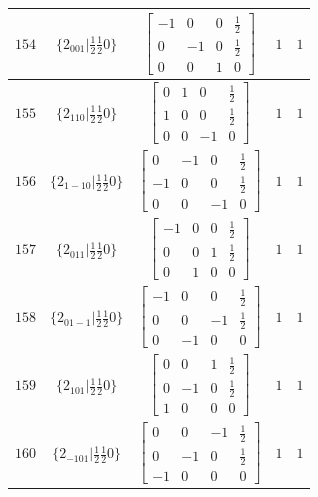 \documentclass[fleqn,8pt]{jsarticle}
\begin{document}
\begin{longtable}{ccccc}
$ 154 $ & $ \{2{}_{001}|\frac{1}{2} \frac{1}{2} 0\} $ & $ \begin{bmatrix} -1 & 0 & 0 & \frac{1}{2} \\ 0 & -1 & 0 & \frac{1}{2} \\ 0 & 0 & 1 & 0 \end{bmatrix} $ & $ 1 $ & $ 1 $ \\ \hline
$ 155 $ & $ \{2{}_{110}|\frac{1}{2} \frac{1}{2} 0\} $ & $ \begin{bmatrix} 0 & 1 & 0 & \frac{1}{2} \\ 1 & 0 & 0 & \frac{1}{2} \\ 0 & 0 & -1 & 0 \end{bmatrix} $ & $ 1 $ & $ 1 $ \\ \hline
$ 156 $ & $ \{2{}_{1-10}|\frac{1}{2} \frac{1}{2} 0\} $ & $ \begin{bmatrix} 0 & -1 & 0 & \frac{1}{2} \\ -1 & 0 & 0 & \frac{1}{2} \\ 0 & 0 & -1 & 0 \end{bmatrix} $ & $ 1 $ & $ 1 $ \\ \hline
$ 157 $ & $ \{2{}_{011}|\frac{1}{2} \frac{1}{2} 0\} $ & $ \begin{bmatrix} -1 & 0 & 0 & \frac{1}{2} \\ 0 & 0 & 1 & \frac{1}{2} \\ 0 & 1 & 0 & 0 \end{bmatrix} $ & $ 1 $ & $ 1 $ \\ \hline
$ 158 $ & $ \{2{}_{01-1}|\frac{1}{2} \frac{1}{2} 0\} $ & $ \begin{bmatrix} -1 & 0 & 0 & \frac{1}{2} \\ 0 & 0 & -1 & \frac{1}{2} \\ 0 & -1 & 0 & 0 \end{bmatrix} $ & $ 1 $ & $ 1 $ \\ \hline
$ 159 $ & $ \{2{}_{101}|\frac{1}{2} \frac{1}{2} 0\} $ & $ \begin{bmatrix} 0 & 0 & 1 & \frac{1}{2} \\ 0 & -1 & 0 & \frac{1}{2} \\ 1 & 0 & 0 & 0 \end{bmatrix} $ & $ 1 $ & $ 1 $ \\ \hline
$ 160 $ & $ \{2{}_{-101}|\frac{1}{2} \frac{1}{2} 0\} $ & $ \begin{bmatrix} 0 & 0 & -1 & \frac{1}{2} \\ 0 & -1 & 0 & \frac{1}{2} \\ -1 & 0 & 0 & 0 \end{bmatrix} $ & $ 1 $ & $ 1 $ \\ \hline

\end{longtable}
\end{document}
